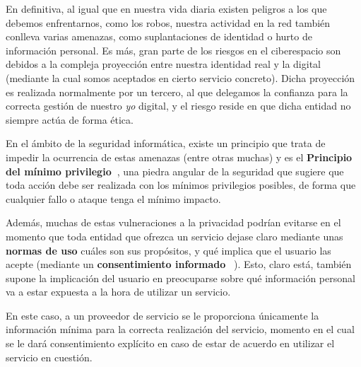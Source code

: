 En definitiva, al igual que en nuestra vida diaria existen peligros a los que debemos enfrentarnos, como los robos, nuestra actividad en la red también conlleva varias amenazas, como suplantaciones de identidad o hurto de información personal. Es más, gran parte de los riesgos en el ciberespacio son debidos a la compleja proyección entre nuestra identidad real y la digital (mediante la cual somos aceptados en cierto servicio concreto). Dicha proyección es realizada  normalmente por un tercero, al que delegamos la confianza para la correcta gestión de nuestro \textit{yo} digital, y el riesgo reside en que dicha entidad no siempre actúa de forma ética.

En el ámbito de la seguridad informática, existe un principio que trata de impedir la ocurrencia de estas amenazas (entre otras muchas) y es el \textbf{Principio del mínimo privilegio~\cite{schneider2003least}}, una piedra angular de la seguridad que sugiere que toda acción debe ser realizada con los mínimos privilegios posibles, de forma que cualquier fallo o ataque tenga el mínimo impacto. 

Además, muchas de estas vulneraciones a la privacidad podrían evitarse en el momento que toda entidad que ofrezca un servicio dejase claro mediante unas \textbf{normas de uso} cuáles son sus propósitos, y qué implica que el usuario las acepte (mediante un \textbf{consentimiento informado}~\cite{lane2014privacy} ). Esto, claro está, también supone la implicación del usuario en preocuparse sobre qué información personal va a estar expuesta a la hora de utilizar un servicio\cite{sanchez2018review}. 

En este caso, a un proveedor de servicio se le proporciona únicamente la información mínima para la correcta realización del servicio, momento en el cual se le dará consentimiento explícito en caso de estar de acuerdo en utilizar el servicio en cuestión. 



